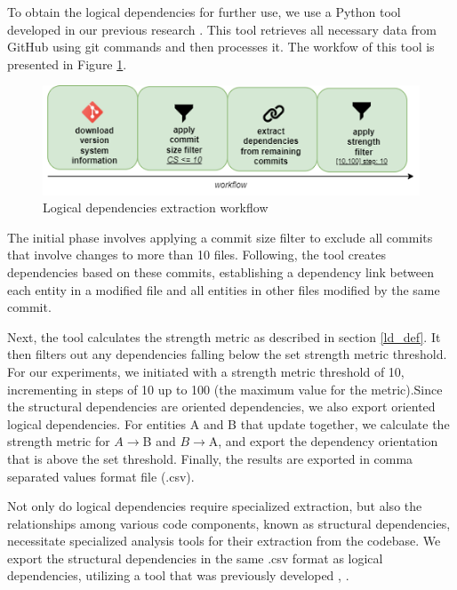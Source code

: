 \documentclass[conference]{IEEEtran}
\begin{document}
To obtain the logical dependencies for further use, we use a Python tool developed in our previous research \cite{articlekeyclass23}. This tool retrieves all necessary data from GitHub \cite{ApacheAntGitHub} using git commands and then processes it. The workfow of this tool is presented in Figure \ref{fig:extraction}.

\begin{figure}[H]
\centering
\includegraphics[width=\columnwidth]{dependencies-export2.png}
\caption{Logical dependencies extraction workflow}
\label{fig:extraction}
\end{figure}

The initial phase involves applying a commit size filter to exclude all commits that involve changes to more than 10 files. Following, the tool creates dependencies based on these commits, establishing a dependency link between each entity in a modified file and all entities in other files modified by the same commit. 

Next, the tool calculates the strength metric as described in section \ref{ld_def}. It then filters out any dependencies falling below the set strength metric threshold. For our experiments, we initiated with a strength metric threshold of 10, incrementing in steps of 10 up to 100 (the maximum value for the metric).Since the structural dependencies are oriented dependencies, we also export oriented logical dependencies. For entities A and B that update together, we calculate the strength metric for $A \rightarrow $B and $B \rightarrow $A, and export the dependency orientation that is above the set threshold. Finally, the results are exported in comma separated values format file (.csv). 

Not only do logical dependencies require specialized extraction, but also the relationships among various code components, known as structural dependencies, necessitate specialized analysis tools for their extraction from the codebase. We export the structural dependencies in the same .csv format as logical dependencies, utilizing a tool that was previously developed \cite{articlekeyclass23}, \cite{Finding-key-classes}.
\end{document}
